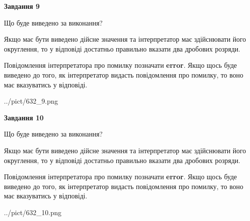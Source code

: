 \documentclass[12pt, ukrainian]{article}
\begin{document}
{\begin {Large}
{\begin {center}\textbf{Завдання 9}\end {center}}\par
Що буде виведено за виконання? \par

Якщо має бути виведено дійсне значення та інтерпретатор має здійснювати його округлення, 
то у відповіді достатньо правильно вказати два дробових розряди.

Повідомлення інтерпретатора про помилку позначати \textbf{error}.
Якщо щось буде виведено до того, як інтерпретатор видасть повідомлення про помилку, 
то воно має вказуватись у відповіді. \par

\begin{center}
	{../pict/632_9.png}
\end{center}
\newpage

{\begin {center}\textbf{Завдання 10}\end {center}}\par
Що буде виведено за виконання? \par

Якщо має бути виведено дійсне значення та інтерпретатор має здійснювати його округлення, 
то у відповіді достатньо правильно вказати два дробових розряди.

Повідомлення інтерпретатора про помилку позначати \textbf{error}.
Якщо щось буде виведено до того, як інтерпретатор видасть повідомлення про помилку, 
то воно має вказуватись у відповіді. \par

\begin{center}
	{../pict/632_10.png}
\end{center}
\newpage

\end {Large}}
\end{document}
